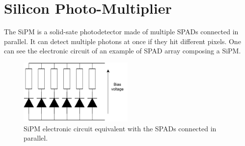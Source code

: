 \section{Silicon Photo-Multiplier}
\label{sec:background:SiPMs}
The SiPM is a solid-sate photodetector made of multiple SPADs connected in parallel. It can detect multiple photons at once if they hit different pixels. One can see the electronic circuit of an example of SPAD array composing a SiPM.
\begin{figure}[htbp]
    \centering
    \includegraphics[width=0.5\textwidth]{gfx/schemes/sipm.drawio.pdf}
    \caption{SiPM electronic circuit equivalent with the SPADs connected in parallel.}
    \label{fig:chapter02:Sipm:electronic scheme}
\end{figure}


